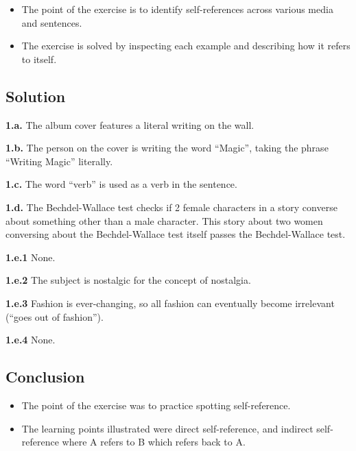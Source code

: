 \documentclass[12pt]{article}
\begin{document}
\begin{itemize}

\item
  The point of the exercise is to identify self-references across various media and sentences.

\item
  The exercise is solved by inspecting each example and describing how it refers to itself.

\end{itemize}


\subsection{Solution}

\textbf{1.a.} The album cover features a literal writing on the wall.

\textbf{1.b.} The person on the cover is writing the word ``Magic'', taking the
phrase ``Writing Magic'' literally.

\textbf{1.c.} The word ``verb'' is used as a verb in the sentence.

\textbf{1.d.} The Bechdel-Wallace test checks if 2 female characters in a story
converse about something other than a male character. This story about two women
conversing about the Bechdel-Wallace test itself passes the Bechdel-Wallace
test.

\textbf{1.e.1} None.

\textbf{1.e.2} The subject is nostalgic for the concept of nostalgia.

\textbf{1.e.3} Fashion is ever-changing, so all fashion can eventually become
irrelevant (``goes out of fashion'').

\textbf{1.e.4} None.


\subsection{Conclusion}

\begin{itemize}

\item
  The point of the exercise was to practice spotting self-reference.

\item
  The learning points illustrated were direct self-reference, and indirect self-reference where A refers to B which refers back to A.

\end{itemize}
\end{document}
